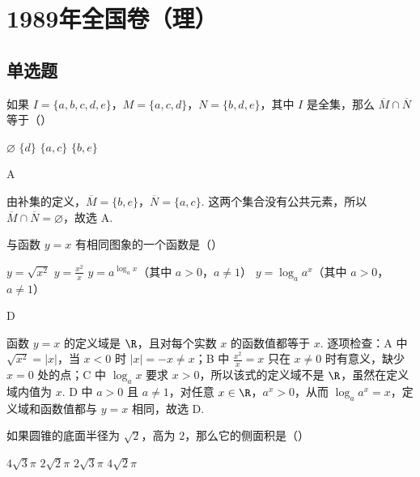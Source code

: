 \chapter{1989年全国卷（理）}

\section{单选题}

\begin{problem}
如果 \(I = \{a, b, c, d, e\}\)，\(M = \{a, c, d\}\)，\(N = \{b, d, e\}\)，其中 \(I\) 是全集，那么 \(\overline{M} \cap \overline{N}\) 等于（\quad）

\choices
    {\(\varnothing\)}
    {\(\{d\}\)}
    {\(\{a, c\}\)}
    {\(\{b, e\}\)}
\end{problem}

\begin{answer}
A
\end{answer}

\begin{solution}
由补集的定义，\(\overline{M}=\{b,e\}\)，\(\overline{N}=\{a,c\}\). 这两个集合没有公共元素，所以 \(\overline{M}\cap\overline{N}=\varnothing\)，故选 A.
\end{solution}

\begin{problem}
与函数 \(y = x\) 有相同图象的一个函数是（\quad）

\choices
    {\(y = \sqrt{x^2}\)}
    {\(y = \frac{x^2}{x}\)}
    {\(y = a^{\log_a x}\)（其中 \(a > 0\)，\(a \neq 1\)）}
    {\(y = \log_a a^x\)（其中 \(a > 0\)，\(a \neq 1\)）}
\end{problem}

\begin{answer}
D
\end{answer}

\begin{solution}
函数 \(y=x\) 的定义域是 \(\R\)，且对每个实数 \(x\) 的函数值都等于 \(x\). 逐项检查：A 中 \(\sqrt{x^2}=|x|\)，当 \(x<0\) 时 \(|x|=-x\neq x\)；B 中 \(\frac{x^2}{x}=x\) 只在 \(x\neq0\) 时有意义，缺少 \(x=0\) 处的点；C 中 \(\log_a x\) 要求 \(x>0\)，所以该式的定义域不是 \(\R\)，虽然在定义域内值为 \(x\). D 中 \(a>0\) 且 \(a\neq1\)，对任意 \(x\in\R\)，\(a^x>0\)，从而 \(\log_a a^x=x\)，定义域和函数值都与 \(y=x\) 相同，故选 D.
\end{solution}

\begin{problem}
如果圆锥的底面半径为 \(\sqrt{2}\)，高为 \(2\)，那么它的侧面积是（\quad）

\choices
    {\(4\sqrt{3}\pi\)}
    {\(2\sqrt{2}\pi\)}
    {\(2\sqrt{3}\pi\)}
    {\(4\sqrt{2}\pi\)}
\end{problem}

